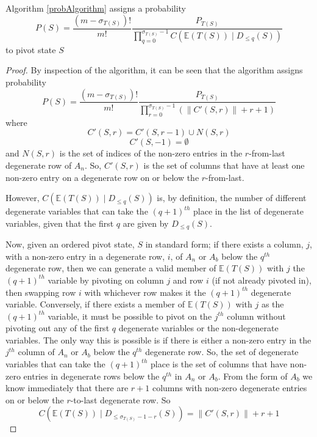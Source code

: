\begin{theorem}
Algorithm \ref{probAlgorithm} assigns a probability
\[
P(S) =  \frac{(m-\sigma_{T(S)})!}{m!} \frac{P_{T(S)}}{\prod_{q=0}^{\sigma_{T(S)}-1} C(\mathbb{E}(T(S)) \mid D_{\le q}(S))}
\]
to pivot state $S$
\end{theorem}
\begin{proof}
By inspection of the algorithm, it can be seen that the algorithm assigns probability 
\[
P(S) =  \frac{(m-\sigma_{T(S)})!}{m!} \frac{P_{T(S)}}{\prod_{r=0}^{\sigma_{T(S)}-1} \left(\left\|C'(S, r)\right\| + r + 1\right)}
\]
where
\[
C'(S,r) = C'(S,r-1) \cup N(S,r)
\]
\[
C'(S,-1) = \emptyset
\]
and $N(S,r)$ is the set of indices of the non-zero entries in the $r$-from-last degenerate row of $A_n$. So, $C'(S,r)$ is the set of columns that have at least one non-zero entry on a degenerate row on or below the $r$-from-last.

However, $C(\mathbb{E}(T(S)) \mid D_{\le q}(S))$ is, by definition, the number of different degenerate variables that can take the $(q+1)^{th}$ place in the list of degenerate variables, given that the first $q$ are given by $D_{\le q}(S)$.

Now, given an ordered pivot state, $S$ in standard form; if there exists a column, $j$, with a non-zero entry in a degenerate row, $i$,  of $A_n$ or $A_b$ below the $q^{th}$ degenerate row, then we can generate a valid member of $\mathbb{E}(T(S))$ with $j$ the $(q+1)^{th}$ variable by pivoting on column $j$ and row $i$ (if not already pivoted in), then swapping row $i$ with whichever row makes it the $(q+1)^{th}$ degenerate variable. Conversely, if there exists a member of $\mathbb{E}(T(S))$ with $j$ as the $(q+1)^{th}$ variable, it must be possible to pivot on the $j^{th}$ column without pivoting out any of the first $q$ degenerate variables or the non-degenerate variables. The only way this is possible is if there is either a non-zero entry in the $j^{th}$ column of $A_n$ or $A_b$ below the $q^{th}$ degenerate row. So, the set of degenerate variables that can take the $(q+1)^{th}$ place is the set of columns that have non-zero entries in degenerate rows below the $q^{th}$ in $A_n$ or $A_b$. From the form of $A_b$ we know immediately that there are $r+1$ columns with non-zero degenerate entries on or below the $r$-to-last degenerate row. So
\[
C(\mathbb{E}(T(S)) \mid D_{\le \sigma_{T(S)} -1 - r}(S)) = \left\|C'(S, r)\right\| + r + 1
\]


\end{proof}

